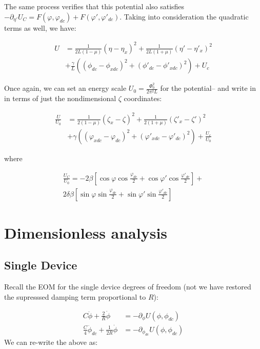 \documentclass[paper=a4, twocolumn, fontsize=10pt]{article} %
\numberwithin{equation}{section} %
\numberwithin{figure}{section} %
\numberwithin{table}{section} %
\begin{document}
The same process verifies that this potential also satisfies $-\partial_{\eta'} U_C = F(\varphi, \varphi_{dc}) + F(\varphi', \varphi'_{dc}) $. Taking into consideration the quadratic terms as well, we have:

\begin{align*}
U &= \frac{1}{2L(1-\mu)} (\eta-\eta_x)^2 + \frac{1}{2L(1+\mu)} (\eta'-\eta'_x)^2 \\
 &+ \frac{\gamma}{L} \left( (\phi_{dc}-\phi_{xdc})^2 + (\phi'_{dc}-\phi'_{xdc})^2\right) + U_c
\end{align*}

Once again, we can set an energy scale $U_0 = \frac{\Phi_0^2}{2\pi^2L}$ for the potential-- and write in in terms of just the nondimensional $\zeta$ coordinates:


\begin{align*}
\frac{U}{U_0} &= \frac{1}{2(1-\mu)} (\zeta_x-\zeta)^2 + \frac{1}{2(1+\mu)} (\zeta'_x-\zeta')^2 \\
 &+ \gamma \left( (\varphi_{xdc}-\varphi_{dc})^2 + (\varphi'_{xdc}-\varphi'_{dc})^2\right) + \frac{U_c}{U_0}
\end{align*}

where

\begin{multline}
    \frac{U_C}{U_0} = -2\beta \left[ \cos\varphi\cos\frac{\varphi_{dc}}{2} + \cos\varphi'\cos\frac{\varphi'_{dc}}{2} \right] + \\
    2\delta\beta \left[ \sin\varphi\sin\frac{\varphi_{dc}}{2} + \sin\varphi'\sin\frac{\varphi'_{dc}}{2} \right]
\end{multline}

\section{Dimensionless analysis}

\subsection{Single Device}

Recall the EOM for the single device degrees of freedom (not we have restored the supresssed damping term proportional to $R$):

\begin{align}
    C \ddot{\phi} + \frac{2}{R} \dot{\phi} &= - \partial_\phi U(\phi, \phi_{dc})
    \\
    \frac{C}{4} \ddot{\phi}_{dc} + \frac{1}{2R} \dot{\phi} &= - \partial_{\phi_{dc}} U(\phi, \phi_{dc})
    \end{align}
We can re-write the above as:
\end{document}
